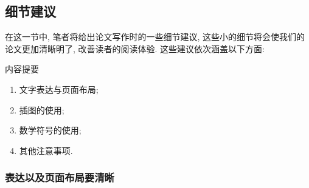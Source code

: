 \documentclass{booki}
\begin{document}
\subsection{细节建议}
{在这一节中, 笔者将给出论文写作时的一些细节建议, 这些小的细节将会使我们的论文更加清晰明了, 改善读者的阅读体验. 这些建议依次涵盖以下方面:}
\begin{titledBox}{内容提要}
        \begin{enumerate}
            \item 文字表达与页面布局;
            \item 插图的使用;
            \item 数学符号的使用;
            \item 其他注意事项.
        \end{enumerate}
\end{titledBox}

\subsubsection{表达以及页面布局要清晰}
\end{document}
